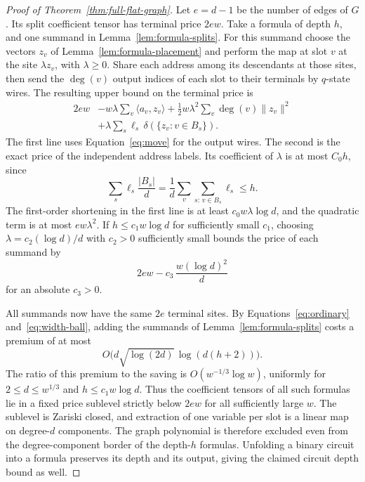 \begin{proof}[Proof of Theorem~\ref{thm:full-flat-graph}]
Let $e=d-1$ be the number of edges of $G$. Its split coefficient
tensor has terminal price $2ew$. Take a formula of depth $h$, and one
summand in Lemma~\ref{lem:formula-splits}. For this summand choose
the vectors $z_v$ of Lemma~\ref{lem:formula-placement} and perform the
map at slot $v$ at the site $\lambda z_v$, with $\lambda\ge0$.
Share each address among its descendants at those sites, then send the
$\deg(v)$ output indices of each slot to their terminals by $q$-state
wires. The resulting upper bound on the terminal price is
\begin{equation}\label{eq:full-flat-profile}
 \begin{aligned}
   2ew
     &-w\lambda\sum_v\langle a_v,z_v\rangle
      +\tfrac12 w\lambda^2\sum_v\deg(v)\|z_v\|^2\\
     &+\lambda\sum_s\ell_s\,\delta(\{z_v:v\in B_s\}).
 \end{aligned}
\end{equation}
The first line uses Equation~\eqref{eq:move} for the output wires.
The second is the exact price of the independent address labels.
Its coefficient of $\lambda$ is at most $C_0h$, since
\[
        \sum_s\ell_s\frac{|B_s|}{d}
            =\frac1d\sum_v\sum_{s:\,v\in B_s}\ell_s\le h .
\]
The first-order shortening in the first line is at least
$c_0w\lambda\log d$, and the quadratic term is at most $ew\lambda^2$.
If $h\le c_1w\log d$ for sufficiently small $c_1$, choosing
$\lambda=c_2(\log d)/d$ with $c_2>0$ sufficiently small bounds
the price of each summand by
\[
                  2ew-c_3\,\frac{w(\log d)^2}{d}
\]
for an absolute $c_3>0$.

All summands now have the same $2e$ terminal sites. By
Equations~\eqref{eq:ordinary} and~\eqref{eq:width-ball}, adding the
summands of Lemma~\ref{lem:formula-splits} costs a premium of at most
\[
                O\bigl(d\sqrt{\log(2d)}\,\log(d(h+2))\bigr).
\]
The ratio of this premium to the saving is $O(w^{-1/3}\log w)$,
uniformly for $2\le d\le w^{1/3}$ and $h\le c_1w\log d$. Thus the
coefficient tensors of all such formulas lie in a fixed price
sublevel strictly below $2ew$ for all sufficiently large $w$.
The sublevel is Zariski closed, and extraction of one variable per
slot is a linear map on degree-$d$ components. The graph polynomial
is therefore excluded even from the degree-component border of the
depth-$h$ formulas. Unfolding a binary circuit into a formula
preserves its depth and its output, giving the claimed circuit depth
bound as well.


\end{proof}
